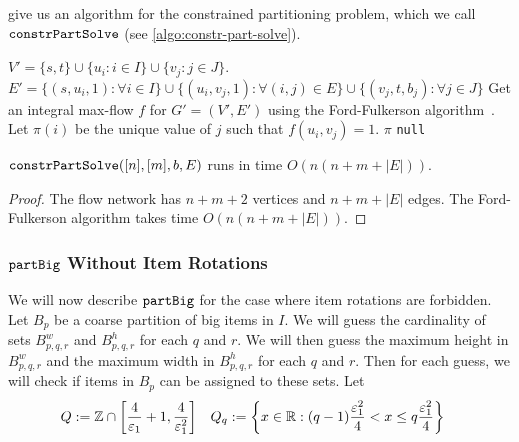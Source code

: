  give us an algorithm
for the constrained partitioning problem, which we call $\operatorname{\mathtt{constrPartSolve}}$
(see \cref{algo:constr-part-solve}).

\begin{algorithm}[htb]
\caption{$\constrPartSolve(I, J, b, E)$}
\label{algo:constr-part-solve}
\begin{algorithmic}[1]
\State $V' = \{s, t\} \cup \{u_i: i \in I\} \cup \{v_j: j \in J\}$.
\State $E' = \{(s, u_i, 1): \forall i \in I\}
    \cup \{(u_i, v_j, 1): \forall (i, j) \in E\}
    \cup \{(v_j, t, b_j): \forall j \in J\}$
\State Get an integral max-flow $f$ for $G' = (V', E')$ using the
    Ford-Fulkerson algorithm~\cite{clrs:max-flow}.
    \State Let $\pi(i)$ be the unique value of $j$ such that $f(u_i, v_j) = 1$.
    \State \Return $\pi$
\Else
    \State \Return \texttt{null}
\EndIf
\end{algorithmic}
\end{algorithm}

\begin{lemma}
$\operatorname{\mathtt{constrPartSolve}}([n], [m], b, E)$ runs in time $O(n(n+m+|E|))$.
\end{lemma}
\begin{proof}
The flow network has $n+m+2$ vertices and $n+m+|E|$ edges.
The Ford-Fulkerson algorithm takes time $O(n(n+m+|E|))$.
\end{proof}

\subsubsection{\texorpdfstring{$\operatorname{\mathtt{partBig}}$}{partBig} Without Item Rotations}
\label{sec:gv-rbbp:part-big:part-big}

We will now describe $\operatorname{\mathtt{partBig}}$ for the case where item rotations are forbidden.
Let $B_p$ be a coarse partition of big items in $I$.
We will guess the cardinality of sets $B^w_{p,q,r}$ and $B^h_{p,q,r}$ for each $q$ and $r$.
We will then guess the maximum height in $B^w_{p,q,r}$
and the maximum width in $B^h_{p,q,r}$ for each $q$ and $r$.
Then for each guess, we will check if items in $B_p$ can be assigned to these sets.
Let
\begin{align*}
Q &:= \mathbb{Z} \cap \left[\frac{4}{\varepsilon_1} + 1, \frac{4}{\varepsilon_1^2}\right]
& Q_q &:= \left\{x \in \mathbb{R}: (q-1)\frac{\varepsilon_1^2}{4}
    < x \le q\frac{\varepsilon_1^2}{4} \right\}
\end{align*}

